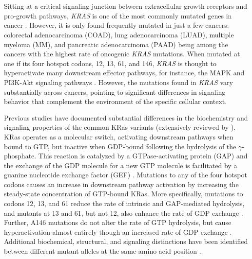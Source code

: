 \documentclass[english, 10pt, letterpaper]{article}
\newcommand{\KRAS}{\emph{KRAS}}
\newcommand{\kras}{KRas}
\begin{document}

\section*{}

Sitting at a critical signaling junction between extracellular growth receptors and pro-growth pathways, \KRAS{} is one of the most commonly mutated genes in cancer \cite{Simanshu2017, Bailey2018}.
However, it is only found frequently mutated in just a few cancers: colorectal adenocarcinoma (COAD), lung adenocarcinoma (LUAD), multiple myeloma (MM), and pancreatic adenocarcinoma (PAAD) being among the cancers with the highest rate of oncogenic \KRAS{} mutations.
When mutated at one if its four hotspot codons, 12, 13, 61, and 146, \KRAS{} is thought to hyperactivate many downstream effector pathways, for instance, the MAPK and PI3K-Akt signaling pathways \cite{Simanshu2017}.
However, the mutations found in \KRAS{} vary substantially across cancers, pointing to significant differences in signaling behavior that complement the environment of the specific cellular context.

Previous studies have documented substantial differences in the biochemistry and signaling properties of the common \kras{} variants (extensively reviewed by \cite{Miller2012, Li2018}).
\kras{} operates as a molecular switch, activating downstream pathways when bound to GTP, but inactive when GDP-bound following the hydrolysis of the $\gamma$-phosphate.
This reaction is catalyzed by a GTPase-activating protein (GAP) and the exchange of the GDP molecule for a new GTP molecule is facilitated by a guanine nucleotide exchange factor (GEF) \cite{Barbacid1987}.
Mutations to any of the four hotspot codons causes an increase in downstream pathway activation by increasing the steady-state concentration of GTP-bound \kras{}.
More specifically, mutations to codons 12, 13, and 61 reduce the rate of intrinsic and GAP-mediated hydrolysis, and mutants at 13 and 61, but not 12, also enhance the rate of GDP exchange \cite{Hunter2015a, Smith2013}.
Further, A146 mutations do not alter the rate of GTP hydrolysis, but cause hyperactivation almost entirely though an increased rate of GDP exchange \cite{Feig1988RelationshipProteins., Edkins2006, Janakiraman2010, Poulin2019}.
Additional biochemical, structural, and signaling distinctions have been identified between different mutant alleles at the same amino acid position \cite{Li2018, Hunter2015a, Poulin2019, Hobbs2019AtypicalCancer., Yu2018, Kovalski2019, Ihle2012, Spoerner2004, Smith2014a, Pantsar2018}.
\end{document}
